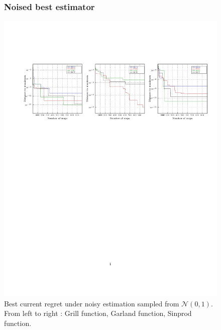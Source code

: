 \documentclass[xcolor={usenames,dvipsnames}]{beamer}
\begin{document}
\begin{frame}
\begin{figure}
\frametitle{Noised best estimator}
\includegraphics[trim={2cm 6cm 0.8cm 4cm},clip,scale = 0.65]{best1000_1.pdf}
\vspace*{-8cm}
 \caption{\label{fig:noise1}Best current regret under noisy estimation sampled from $\mathcal{N}(0,1)$. From left to right : Grill function, Garland function, Sinprod function.}
\end{figure}
\end{frame}
\end{document}
